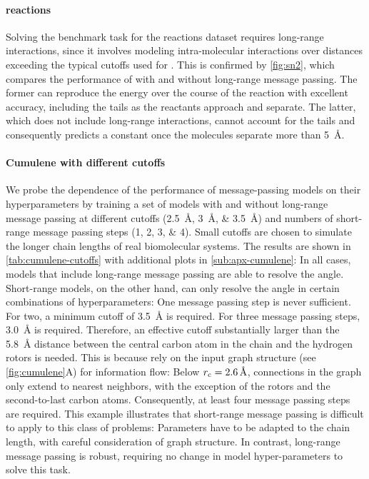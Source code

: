 \documentclass[10pt]{article} %
\begin{document}
\paragraph{\sn reactions} Solving the benchmark task for the \sn reactions dataset requires long-range interactions, since it involves modeling intra-molecular interactions over distances exceeding the typical cutoffs used for \mlps. This is confirmed by \cref{fig:sn2}, which compares the performance of \lorem with and without long-range message passing. The former can reproduce the energy over the course of the reaction with excellent accuracy, including the tails as the reactants approach and separate. The latter, which does not include long-range interactions, cannot account for the tails and consequently predicts a constant once the molecules separate more than \qty{5}{\angstrom}.



\paragraph{Cumulene with different cutoffs} We probe the dependence of the performance of message-passing models on their hyperparameters by training a set of \lorem models with and without long-range message passing at different cutoffs (\qtylist{2.5;3;3.5}{\angstrom}) and numbers of short-range message passing steps (\numlist{1;2;3;4}). Small cutoffs are chosen to simulate the longer chain lengths of real biomolecular systems.
The results are shown in \cref{tab:cumulene-cutoffs} with additional plots in \cref{sub:apx-cumulene}: In all cases, models that include long-range message passing are able to resolve the angle. Short-range models, on the other hand, can only resolve the angle in certain combinations of hyperparameters: One message passing step is never sufficient. For two, a minimum cutoff of \qty{3.5}{\angstrom} is required. For three message passing steps, \qty{3.0}{\angstrom} is required.
Therefore, an effective cutoff substantially larger than the \qty{5.8}{\angstrom} distance between the central carbon atom in the chain and the hydrogen rotors is needed.
This is because \mpnns rely on the input graph structure (see \cref{fig:cumulene}A) for information flow: Below $r_{\text{c}}=\qty{2.6}{\angstrom}$, connections in the graph only extend to nearest neighbors, with the exception of the rotors and the second-to-last carbon atoms. Consequently, at least four message passing steps are required.
This example illustrates that short-range message passing is difficult to apply to this class of problems: Parameters have to be adapted to the chain length, with careful consideration of graph structure. In contrast, long-range message passing is robust, requiring no change in model hyper-parameters to solve this task.
\end{document}
